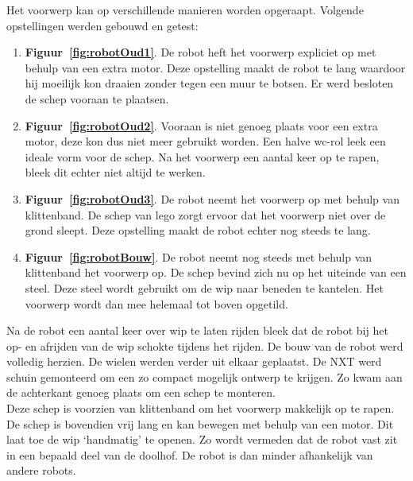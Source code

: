 \documentclass[tt3]{penoverslag}
\begin{document}
Het voorwerp kan op verschillende manieren worden opgeraapt. Volgende opstellingen werden gebouwd en getest:

\begin{enumerate}
\item \textbf{Figuur~\ref{fig:robotOud1}}. De robot heft het voorwerp expliciet op met behulp van een extra motor. Deze opstelling maakt de robot te lang waardoor hij moeilijk kon draaien zonder tegen een muur te botsen. Er werd besloten de schep vooraan te plaatsen.
\item \textbf{Figuur~\ref{fig:robotOud2}}. Vooraan is niet genoeg plaats voor een extra motor, deze kon dus niet meer gebruikt worden. Een halve wc-rol leek een ideale vorm voor de schep. Na het voorwerp een aantal keer op te rapen, bleek dit echter niet altijd te werken.
\item \textbf{Figuur~\ref{fig:robotOud3}}. De robot neemt het voorwerp op met behulp van klittenband. De schep van lego zorgt ervoor dat het voorwerp niet over de grond sleept. Deze opstelling maakt de robot echter nog steeds te lang.
\item \textbf{Figuur~\ref{fig:robotBouw}}. De robot neemt nog steeds met behulp van klittenband het voorwerp op. De schep bevind zich nu op het uiteinde van een steel. Deze steel wordt gebruikt om de wip naar beneden te kantelen. Het voorwerp wordt dan mee helemaal tot boven opgetild.  %
\end{enumerate}

Na de robot een aantal keer over wip te laten rijden bleek dat de robot bij het op- en afrijden van de wip schokte tijdens het rijden. De bouw van de robot werd volledig herzien. De wielen werden verder uit elkaar geplaatst. De NXT werd schuin gemonteerd om een zo compact mogelijk ontwerp te krijgen. Zo kwam aan de achterkant genoeg plaats om een schep te monteren.\\

Deze schep is voorzien van klittenband om het voorwerp makkelijk op te rapen. De schep is bovendien vrij lang en kan bewegen met behulp van een motor. Dit laat toe de wip `handmatig' te openen. Zo wordt vermeden dat de robot vast zit in een bepaald deel van de doolhof. De robot is dan minder afhankelijk van andere robots.

\end{document}
